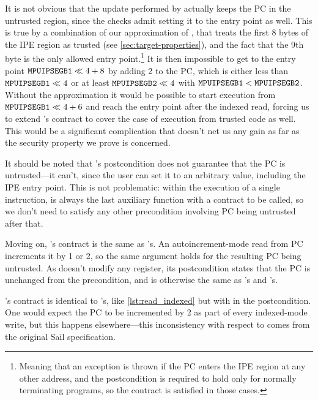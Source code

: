 It is not obvious that the update performed by  actually keeps the PC in the untrusted region, since the checks admit setting it to the entry point as well. This is true by a combination of our approximation of , that treats the first 8 bytes of the IPE region as trusted (see \cref{sec:target-properties}), and the fact that the 9th byte is the only allowed entry point.\footnote{Meaning that an exception is thrown if the PC enters the IPE region at any other address, and the postcondition is required to hold only for normally terminating programs, so the contract is satisfied in those cases.} It is then impossible to get to the entry point \(\reg{MPUIPSEGB1} \ll 4 + 8\) by adding 2 to the PC, which is either less than \(\reg{MPUIPSEGB1} \ll 4\) or at least \(\reg{MPUIPSEGB2} \ll 4\) with \(\reg{MPUIPSEGB1} < \reg{MPUIPSEGB2}\). Without the approximation it would be possible to start execution from \(\reg{MPUIPSEGB1} \ll 4 + 6\) and reach the entry point after the indexed read, forcing us to extend 's contract to cover the case of execution from trusted code as well. This would be a significant complication that doesn't net us any gain as far as the security property we prove is concerned.


It should be noted that 's postcondition does not guarantee that the PC is untrusted---it can't, since the user can set it to an arbitrary value, including the IPE entry point. This is not problematic: within the execution of a single instruction,  is always the last auxiliary function with a contract to be called, so we don't need to satisfy any other precondition involving PC being untrusted after that.

Moving on, 's contract is the same as 's. An auto\-increment-\-mode read from PC increments it by 1 or 2, so the same argument holds for the resulting PC being untrusted. As  doesn't modify any register, its postcondition states that the PC is unchanged from the precondition, and is otherwise the same as 's and 's.

's contract is identical to 's, \ie like \cref{lst:read_indexed} but with  in the postcondition. One would expect the PC to be incremented by 2 as part of every indexed-mode write, but this happens elsewhere---this inconsistency with respect to  comes from the original Sail specification.

